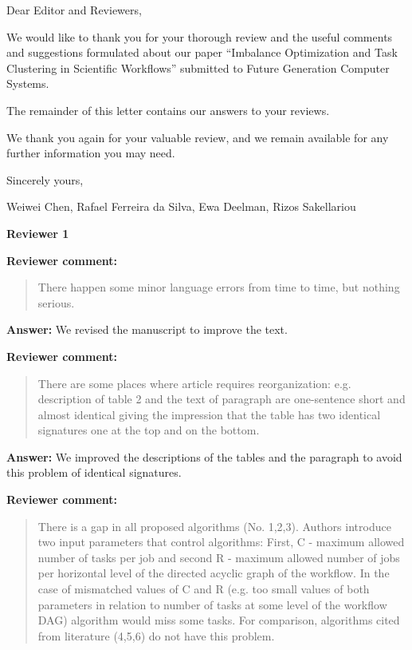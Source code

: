 \documentclass{letter}
\date{July 31st 2014}
\newenvironment{review}%
{\textbf{Reviewer comment:}\begin{quote}}%
{\end{quote}}%
\newcommand{\answer}[1]{%
      \textbf{Answer:} #1}
\begin{document}
\begin{letter}{}

\opening{Dear Editor and Reviewers,}

We would like to thank you for your thorough review and the useful
comments and suggestions formulated about our paper ``Imbalance Optimization and Task Clustering in Scientific Workflows'' submitted to
Future Generation Computer Systems.

The remainder of this letter contains our answers to your reviews. 

We thank you again for your valuable review, and we remain available for any further information you may need.

\vspace{0.5cm}

Sincerely yours,

\vspace{1cm}

Weiwei Chen, Rafael Ferreira da Silva, Ewa Deelman, Rizos Sakellariou

\newpage

\textbf{Reviewer 1}


\begin{review}
There happen some minor language errors from time to time, but nothing serious. 
\end{review}

\answer{We revised the manuscript to improve the text.}


\begin{review}
There are some places where article requires reorganization: e.g. description of table 2 and the text of paragraph are one-sentence short and almost identical giving the impression that the table has two identical signatures one at the top and on the bottom. 
\end{review}

\answer{We improved the descriptions of the tables and the paragraph to avoid this problem of identical signatures.}


\begin{review}
There is a gap in all proposed algorithms (No. 1,2,3). Authors introduce two input parameters that control algorithms: First, C - maximum allowed number of tasks per job and second R - maximum allowed number of jobs per horizontal level of the directed acyclic graph of  the workflow. In the case of mismatched values of C and R (e.g. too small values of both parameters in relation to number of tasks at some level of the workflow DAG) algorithm would miss some tasks. For comparison, algorithms cited from literature (4,5,6) do not have this problem.
\end{review}


\end{letter}
\end{document}
